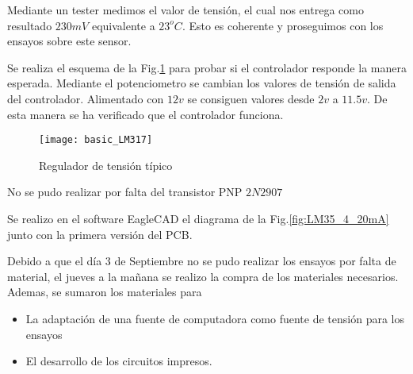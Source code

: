 Mediante un tester medimos el valor de tensión, el cual nos entrega como resultado 
$230mV$ equivalente a $23^oC$. Esto es coherente y proseguimos con los ensayos sobre este
sensor.

Se realiza el esquema de la Fig.\ref{fig:basic_LM317} para probar si el
controlador responde la manera esperada. Mediante el potenciometro se cambian los valores
de tensión de salida del controlador. Alimentado con $12v$ se consiguen valores desde
$2v$ a $11.5v$. De esta manera se ha verificado que el controlador funciona.

\begin{figure}[H] %
  \begin{center}
  \texttt{[image: basic\_LM317]}
  \end{center}
  \caption{Regulador de tensión típico }
  \label{fig:basic_LM317}
\end{figure}


No se pudo realizar por falta del transistor PNP $2N2907$

Se realizo en el software EagleCAD el diagrama de la Fig.\ref{fig:LM35_4_20mA} junto con 
la primera versión del PCB.

Debido a que el día 3 de Septiembre no se pudo realizar los ensayos por falta de material,
el jueves a la mañana se realizo la compra de los materiales necesarios. Ademas, se sumaron
los materiales para 
\begin{itemize}
 \item La adaptación de una fuente de computadora como fuente de tensión para
los ensayos
\item El desarrollo de los circuitos impresos.
\end{itemize}
 
